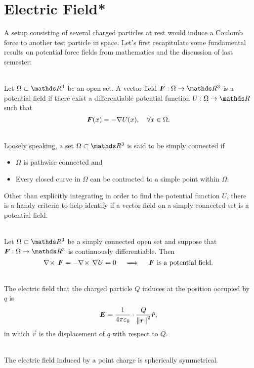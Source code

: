\section{Electric Field*}
A setup consisting of several charged particles at rest would induce a Coulomb force to another test particle in space. Let's first recapitulate some fundamental results on potential force fields from mathematics and the discussion of last semester:
\begin{definition}
    \ \\Let $\Omega\subset\R^3$ be an open set. A vector field $\vec{F}: \Omega\to\R^3$ is a potential field if there exist a differentiable potential function $U: \Omega\to\R$ such that
    \[\bm{F}(x)=-\nabla U(x),\quad\forall x\in\Omega.\]
\end{definition}
\begin{definition}
    \ \\Loosely speaking, a set \(\Omega\subset\R^3\) is said to be simply connected if
    \begin{itemize}
        \item $\Omega$ is pathwise connected and
        \item Every closed curve in $\Omega$ can be contracted to a simple point within $\Omega$.
    \end{itemize}
\end{definition}
Other than explicitly integrating in order to find the potential function \(U\), there is a handy criteria to help identify if a vector field on a simply connected set is a potential field.
\begin{theorem}
    \ \\Let $\Omega\subset\R^3$ be a simply connected open set and suppose that $\vec{F}:\Omega\to\R^3$ is continuously differentiable. Then
    $$\nabla\!\times\,\bm{F}=-\nabla\!\times\,\nabla U=0\quad\implies\quad \bm{F}\text{ is a potential field.}$$
\end{theorem}
\begin{definition}
    \ \\The electric field that the charged particle $Q$ induces at the position occupied by $q$ is
        $$\bm{E}=\frac{1}{4\pi\varepsilon_0}\cdot\frac{Q}{\left\lVert \bm{r} \right\rVert^2}\hat{\bm{r}}, $$
        in which $\vec{r}$ is the displacement of $q$ with respect to $Q$.
\end{definition}
\begin{proposition}
    \ \\The electric field induced by a point charge is spherically symmetrical.
\end{proposition}